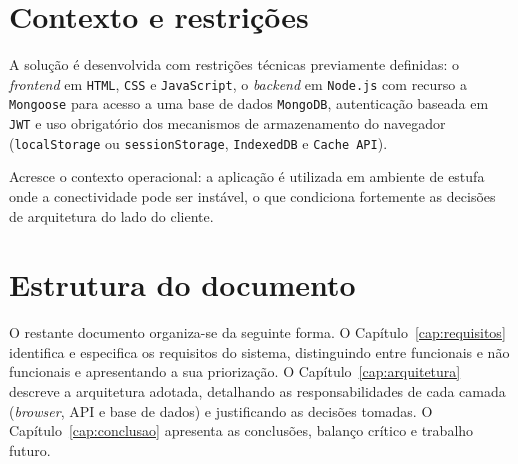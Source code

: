 \section{Contexto e restrições}
\label{sec:contexto}


A solução é desenvolvida com restrições técnicas previamente
definidas: o \emph{frontend} em \texttt{HTML}, \texttt{CSS} e
\texttt{JavaScript}, o \emph{backend} em \texttt{Node.js} com
recurso a \texttt{Mongoose} para acesso a uma base de dados
\texttt{MongoDB}, autenticação baseada em \texttt{JWT} e uso obrigatório
dos mecanismos de armazenamento do navegador (\texttt{localStorage}
ou \texttt{sessionStorage}, \texttt{IndexedDB} e \texttt{Cache API}).

Acresce o contexto operacional: a aplicação é utilizada em ambiente
de estufa onde a conectividade pode ser instável, o que condiciona
fortemente as decisões de arquitetura do lado do cliente.


\section{Estrutura do documento}
\label{sec:estrutura}


O restante documento organiza-se da seguinte forma. O Capítulo~\ref{cap:requisitos}
identifica e especifica os requisitos do sistema, distinguindo entre
funcionais e não funcionais e apresentando a sua priorização. O
Capítulo~\ref{cap:arquitetura} descreve a arquitetura adotada,
detalhando as responsabilidades de cada camada (\emph{browser}, API e
base de dados) e justificando as decisões tomadas. O
Capítulo~\ref{cap:conclusao} apresenta as conclusões, balanço crítico
e trabalho futuro.
